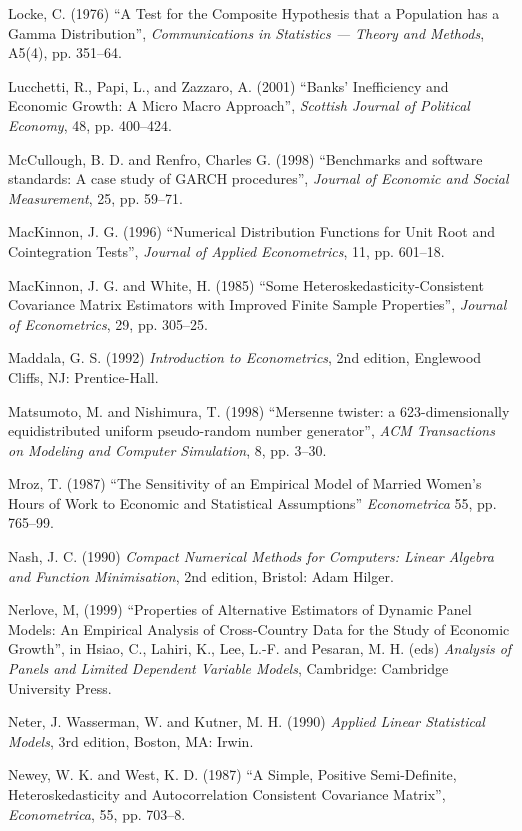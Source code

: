 \begin{thebibliography}
  Locke, C. (1976) ``A Test for the Composite Hypothesis that a
  Population has a Gamma Distribution'', \emph{Communications in
    Statistics --- Theory and Methods}, A5(4), pp. 351--64.
  
  Lucchetti, R., Papi, L., and Zazzaro, A. (2001) ``Banks'
  Inefficiency and Economic Growth: A Micro Macro Approach'',
  \emph{Scottish Journal of Political Economy}, 48, pp. 400--424.

  McCullough, B. D. and Renfro, Charles G. (1998) ``Benchmarks and
  software standards: A case study of GARCH procedures'',
  \emph{Journal of Economic and Social Measurement}, 25, pp. 59--71.

  MacKinnon, J. G. (1996) ``Numerical Distribution Functions for Unit
  Root and Cointegration Tests'', \emph{Journal of Applied
    Econometrics}, 11, pp. 601--18.
  
  MacKinnon, J. G. and White, H.  (1985) ``Some
  Heteroskedasticity-Consistent Covariance Matrix Estimators with
  Improved Finite Sample Properties'', \emph{Journal of Econometrics},
  29, pp. 305--25.
  
  Maddala, G. S. (1992) \emph{Introduction to Econometrics}, 2nd
  edition, Englewood Cliffs, NJ: Prentice-Hall.
  
  Matsumoto, M. and Nishimura, T.  (1998) ``Mersenne twister: a
  623-dimensionally equidistributed uniform pseudo-random number
  generator'', \emph{ACM Transactions on Modeling and Computer
    Simulation}, 8, pp. 3--30.

  Mroz, T. (1987) ``The Sensitivity of an Empirical Model of Married
  Women's Hours of Work to Economic and Statistical Assumptions''
  \emph{Econometrica} 55, pp. 765--99.

  Nash, J. C. (1990) \emph{Compact Numerical Methods for Computers:
    Linear Algebra and Function Minimisation}, 2nd edition, Bristol:
  Adam Hilger.

  Nerlove, M, (1999) ``Properties of Alternative Estimators of Dynamic
  Panel Models: An Empirical Analysis of Cross-Country Data for the
  Study of Economic Growth'', in Hsiao, C., Lahiri, K., Lee, L.-F. and
  Pesaran, M. H. (eds) \emph{Analysis of Panels and Limited Dependent
    Variable Models}, Cambridge: Cambridge University Press.
    
  Neter, J. Wasserman, W. and Kutner, M. H. (1990) \emph{Applied
    Linear Statistical Models}, 3rd edition, Boston, MA: Irwin.

  Newey, W. K. and West, K. D. (1987) ``A Simple, Positive
  Semi-Definite, Heteroskedasticity and Autocorrelation Consistent
  Covariance Matrix'', \emph{Econometrica}, 55, pp. 703--8.


\end{thebibliography}
